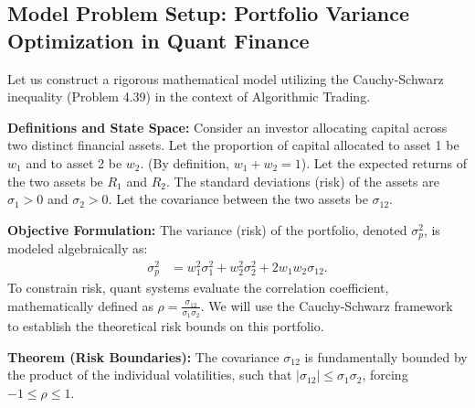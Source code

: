 \documentclass[11pt]{article}
\theoremstyle{definition}
\theoremstyle{remark}
\begin{document}
\begin{itemize}
\subsection{Model Problem Setup: Portfolio Variance Optimization in Quant Finance}
Let us construct a rigorous mathematical model utilizing the Cauchy-Schwarz inequality (Problem 4.39) in the context of Algorithmic Trading.

\textbf{Definitions and State Space:}
Consider an investor allocating capital across two distinct financial assets. Let the proportion of capital allocated to asset 1 be $w_1$ and to asset 2 be $w_2$. (By definition, $w_1 + w_2 = 1$). 
Let the expected returns of the two assets be $R_1$ and $R_2$. The standard deviations (risk) of the assets are $\sigma_1 > 0$ and $\sigma_2 > 0$. Let the covariance between the two assets be $\sigma_{12}$.

\textbf{Objective Formulation:}
The variance (risk) of the portfolio, denoted $\sigma_p^2$, is modeled algebraically as:
\begin{align*}
    \sigma_p^2 &= w_1^2 \sigma_1^2 + w_2^2 \sigma_2^2 + 2w_1w_2\sigma_{12}.
\end{align*}
To constrain risk, quant systems evaluate the correlation coefficient, mathematically defined as $\rho = \frac{\sigma_{12}}{\sigma_1 \sigma_2}$.
We will use the Cauchy-Schwarz framework to establish the theoretical risk bounds on this portfolio.

\textbf{Theorem (Risk Boundaries):} The covariance $\sigma_{12}$ is fundamentally bounded by the product of the individual volatilities, such that $|\sigma_{12}| \le \sigma_1 \sigma_2$, forcing $-1 \le \rho \le 1$.


\end{itemize}
\end{document}
